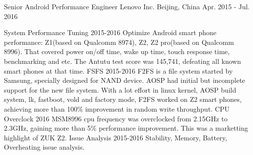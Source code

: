 \begin{cventries}
  \cventry
    {Senior Android Performance Engineer} %
    {Lenovo Inc.} %
    {Beijing, China} %
    {Apr. 2015 - Jul. 2016} %
    {
      \begin{cvsubentries} %
        \cvsubentry
          {}
          {System Performance Tuning}
          {2015-2016}
          {Optimize Android smart phone performance: Z1(based on Qualcomm 8974), Z2, Z2 pro(based on Qualcomm 8996).
           That covered power on/off time, wake up time, touch response time, benchmarking and etc.
           The Antutu test score was 145,741, defeating all known smart phones at that time.}
        \cvsubentry
          {}
          {FSFS}
          {2015-2016}
          {F2FS is a file system started by Samsung, specially designed for NAND device.
           AOSP had initial but incomplete support for the new file system.
           With a lot effort in linux kernel, AOSP build system, lk, fastboot, vold and factory mode,
           F2FS worked on Z2 smart phones, achieving more than 100\% improvement in random write throughput.}
        \cvsubentry
          {}
          {CPU Overclock}
          {2016}
          {MSM8996 cpu frequency was overclocked from 2.15GHz to 2.3GHz, gaining more than 5\% performance improvement.
           This was a marketting highlight of ZUK Z2.}
        \cvsubentry
          {}
          {Issue Analysis}
          {2015-2016}
          {Stability, Memory, Battery, Overheating issue analysis.}
      \end{cvsubentries}
    }


\end{cventries}
